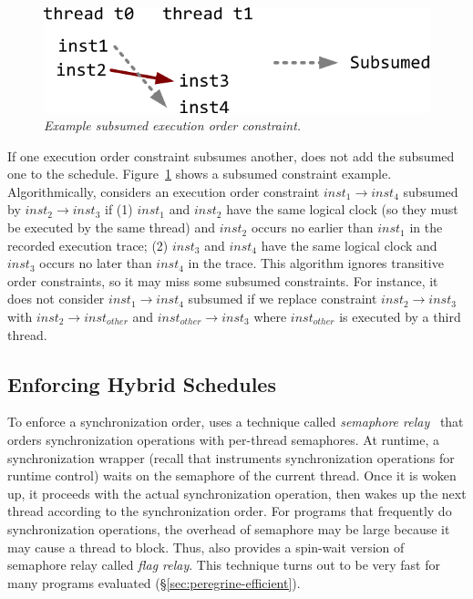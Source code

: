 \begin{figure}[t]
\centering
\includegraphics[width=.65\columnwidth]{peregrine/figures/pruned-order}
\caption{{\em Example subsumed execution order
    constraint.}} \label{fig:peregrine-subsumed}
\end{figure}

If one execution order constraint subsumes another, \peregrine does not add the
subsumed one to the schedule.  Figure~\ref{fig:peregrine-subsumed} shows a subsumed
constraint example.  Algorithmically, \peregrine considers an execution order
constraint $inst_1 \rightarrow inst_4$ subsumed by $inst_2 \rightarrow
inst_3$ if (1) $inst_1$ and $inst_2$ have the same logical clock (so they
must be executed by the same thread) and $inst_2$ occurs no earlier than
$inst_1$ in the recorded execution trace; (2) $inst_3$ and $inst_4$ have
the same logical clock and $inst_3$ occurs no later than $inst_4$ in the
trace.  This algorithm ignores
transitive order constraints, so it may miss some subsumed constraints.
For instance, it does not consider $inst_1 \rightarrow inst_4$ subsumed if
we replace constraint $inst_2 \rightarrow inst_3$ with $inst_2 \rightarrow
inst_{other}$ and $inst_{other} \rightarrow inst_3$ where $inst_{other}$
is executed by a third thread.

\subsection{Enforcing Hybrid Schedules} \label{sec:peregrine-enforce-schedule}

To enforce a synchronization order, \peregrine uses a technique called
\emph{semaphore relay}~\cite{cui:tern:osdi10} that orders synchronization
operations with per-thread semaphores.
At runtime, a synchronization wrapper
(recall that \peregrine instruments synchronization operations for runtime
control) waits on the semaphore of the current thread.  Once it is woken
up, it proceeds with the actual synchronization operation, then wakes up
the next thread according to the synchronization order.  
For programs that frequently do synchronization operations, the overhead
of semaphore may be large because it may cause a thread to block.  Thus,
\peregrine also provides a spin-wait version of
semaphore relay called \emph{flag relay}.
This technique turns out to be very
fast for many programs evaluated (\S\ref{sec:peregrine-efficient}).


